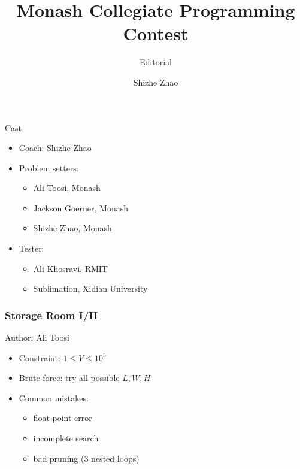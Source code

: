 \documentclass{beamer}
\title[MCPC2020]{
  Monash Collegiate Programming Contest
}
\subtitle {Editorial}
\date{}
\author[Shizhe Zhao]{
  Shizhe Zhao
}
\begin{document}

\frame{\titlepage}
\section[]{}

\begin{frame}{Cast}
  \begin{itemize}
    \item Coach: Shizhe Zhao
    \item Problem setters:
    \begin{itemize}
      \item Ali Toosi, Monash
      \item Jackson Goerner, Monash
      \item Shizhe Zhao, Monash
    \end{itemize}
    \item Tester: 
    \begin{itemize}
      \item Ali Khosravi, RMIT
      \item Sublimation, Xidian University
    \end{itemize}
  \end{itemize}
\end{frame}

\begin{frame}
  \frametitle{Storage Room I/II}
Author: Ali Toosi

\begin{itemize}
  \item Constraint: $1 \le V \le 10^3$
  \item Brute-force: try all possible $L, W, H$
  \item Common mistakes:
    \begin{itemize}
      \item float-point error
      \item incomplete search
      \item bad pruning (3 nested loops)
    \end{itemize}
\end{itemize}
\end{frame}
\end{document}
